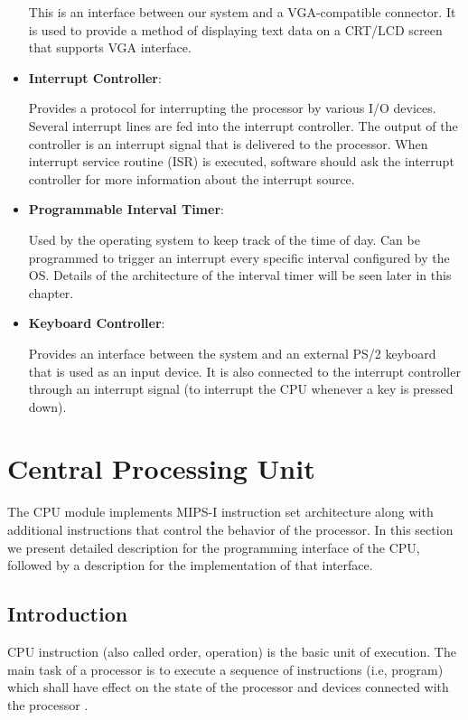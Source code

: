 \documentclass[oneside]{book}
\begin{document}
\begin{itemize}
This is an interface between our system and a VGA-compatible connector.
It is used to provide a method of displaying text data on a CRT/LCD screen
that supports VGA interface.

\item \textbf{Interrupt Controller}:

Provides a protocol for interrupting the processor by various I/O devices.
Several interrupt lines are fed into the interrupt controller. The output
of the controller is an interrupt signal that is delivered to the processor.
When interrupt service routine (ISR) is executed, software should ask
the interrupt controller for more information about the interrupt source.

\item \textbf{Programmable Interval Timer}:

Used by the operating system to keep track of the time of day. Can be
programmed to trigger an interrupt every specific interval configured
by the OS. Details of the architecture of the interval timer will be
seen later in this chapter.

\item \textbf{Keyboard Controller}:

Provides an interface between the system and an external PS/2 keyboard
that is used as an input device. It is also connected to the interrupt
controller through an interrupt signal (to interrupt the CPU whenever
a key is pressed down).

\end{itemize}

\section{Central Processing Unit}

The CPU module implements MIPS-I instruction set architecture along with
additional instructions that control the behavior of the processor. In this
section we present detailed description for the programming interface
of the CPU, followed by a description for the implementation of that
interface.

\subsection{Introduction}

CPU instruction (also called order, operation) is the basic unit
of execution. The main task of a processor is to execute a sequence
of instructions (i.e, program) which shall have effect on the state
of the processor and devices connected with the processor \cite{clements}.\\
\end{document}
